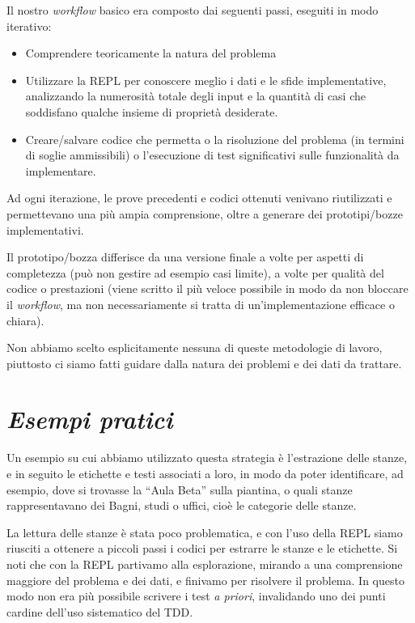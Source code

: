 \documentclass[12pt]{report}
\begin{document}
Il nostro \textit{workflow} basico era composto dai seguenti passi, eseguiti in modo iterativo:

\begin{itemize}
	\item Comprendere teoricamente la natura del problema
	\item Utilizzare la REPL per conoscere meglio i dati e le sfide implementative, analizzando la numerosità totale degli input e la quantità di casi che soddisfano  qualche insieme di proprietà desiderate.
	\item Creare/salvare codice che permetta o la risoluzione del problema (in termini di soglie ammissibili) o l'esecuzione di test significativi sulle funzionalità da implementare.
\end{itemize}

Ad ogni iterazione, le prove precedenti e codici ottenuti venivano riutilizzati e permettevano una più ampia comprensione, oltre a generare dei prototipi/bozze implementativi.

Il prototipo/bozza differisce da una versione finale a volte per aspetti di completezza (può non gestire ad esempio casi limite), a volte per qualità del codice o prestazioni (viene scritto il più veloce possibile in modo da non bloccare il \textit{workflow}, ma non necessariamente si tratta di un'implementazione efficace o chiara).

Non abbiamo scelto esplicitamente nessuna di queste metodologie di lavoro, piuttosto ci siamo fatti guidare dalla natura dei problemi e dei dati da trattare. 

\section*{\textit{Esempi pratici}}

Un esempio su cui abbiamo utilizzato questa strategia è l'estrazione delle stanze, e in seguito le etichette e testi associati a loro, in modo da poter identificare, ad esempio, dove si trovasse la ``Aula Beta'' sulla piantina, o quali stanze rappresentavano dei Bagni, studi o uffici, cioè le categorie delle stanze.

La lettura delle stanze è stata poco problematica, e con l'uso della REPL siamo riusciti a ottenere a piccoli passi i codici per estrarre le stanze e le etichette. Si noti che con la REPL partivamo alla esplorazione, mirando a una comprensione maggiore del problema e dei dati, e finivamo per risolvere il problema. In questo modo non era più possibile scrivere i test \textit{a priori}, invalidando uno dei punti cardine dell'uso sistematico del TDD.
\end{document}
